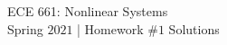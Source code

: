 \begin{center}

{\Large ECE 661: Nonlinear Systems \\[0ex]
Spring $2021$ | Homework $\#1$ Solutions}
\end{center}

\vspace{0.1in}





\bracketedpoints


